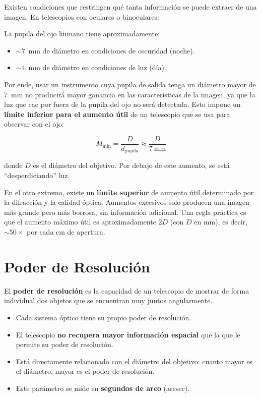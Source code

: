 Existen condiciones que restringen qué tanta información se puede extraer de una imagen. En telescopios con oculares o binoculares:

La pupila del ojo humano tiene aproximadamente:
\begin{itemize}
    \item $\sim 7$~mm de diámetro en condiciones de oscuridad (noche).
    \item $\sim 4$~mm de diámetro en condiciones de luz (día).
\end{itemize}

Por ende, usar un instrumento cuya pupila de salida tenga un diámetro mayor de 7~mm no producirá mayor ganancia en las características de la imagen, ya que la luz que cae por fuera de la pupila del ojo no será detectada. Esto impone un \textbf{límite inferior para el aumento útil} de un telescopio que se usa para observar con el ojo:

$$M_{\text{mín}} = \frac{D}{d_{\text{pupila}}} \approx \frac{D}{7~\text{mm}}$$

donde $D$ es el diámetro del objetivo. Por debajo de este aumento, se está ``desperdiciando'' luz.

En el otro extremo, existe un \textbf{límite superior} de aumento útil determinado por la difracción y la calidad óptica. Aumentos excesivos solo producen una imagen más grande pero más borrosa, sin información adicional. Una regla práctica es que el aumento máximo útil es aproximadamente $2D$ (con $D$ en mm), es decir, $\sim 50\times$ por cada cm de apertura.

\section{Poder de Resolución}

El \textbf{poder de resolución} es la capacidad de un telescopio de mostrar de forma individual dos objetos que se encuentran muy juntos angularmente.

\begin{itemize}
    \item Cada sistema óptico tiene su propio poder de resolución.
    \item El telescopio \textbf{no recupera mayor información espacial} que la que le permite su poder de resolución.
    \item Está directamente relacionado con el diámetro del objetivo: cuanto mayor es el diámetro, mayor es el poder de resolución.
    \item Este parámetro se mide en \textbf{segundos de arco} (arcsec).
\end{itemize}


